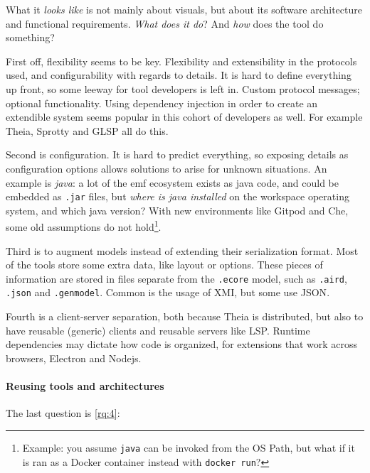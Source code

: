 What it \emph{looks like} is not mainly about visuals, but about its software architecture and functional requirements.
\textit{What does it do}?
And \textit{how} does the tool do something?

First off, flexibility seems to be key.
Flexibility and extensibility in the protocols used, and configurability with regards to details.
It is hard to define everything up front, so some leeway for tool developers is left in.
Custom protocol messages; optional functionality.
Using dependency injection in order to create an extendible system seems popular in this cohort of developers as well.
For example \gls{Theia}, Sprotty and \gls{GLSP} all do this.

Second is configuration. 
It is hard to predict everything, so exposing details as configuration options allows solutions to arise for unknown situations.
An example is \textit{java}: a lot of the \gls{emf} ecosystem exists as java code, and could be embedded as \texttt{.jar} files, but \emph{where is java installed} on the workspace operating system, and which java version?
With new environments like Gitpod and Che, some old assumptions do not hold\footnote{Example: you assume \texttt{java} can be invoked from the OS Path, but what if it is ran as a Docker container instead with \texttt{docker run}?}.

Third is to augment models instead of extending their serialization format.
Most of the tools store some extra data, like layout or options.
These pieces of information are stored in files separate from the \texttt{.ecore} model, such as \texttt{.aird}, \texttt{.json} and \texttt{.genmodel}.
Common is the usage of \gls{XMI}, but some use \gls{JSON}.

Fourth is a client-server separation, both because \gls{Theia} is distributed, but also to have reusable (generic) clients and reusable servers like \gls{LSP}.
Runtime dependencies may dictate how code is organized, for extensions that work across browsers, \gls{Electron} and \gls{Nodejs}.



\paragraph*{Reusing tools and architectures}
The last question is \cref{rq:4}:
\begin{displayquote}
  
\end{displayquote}

